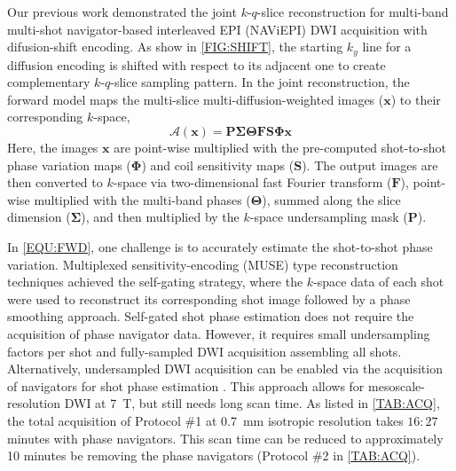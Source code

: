 \documentclass[AMA,STIX2COL,Linenumberson]{MRM}
\begin{document}
Our previous work \cite{tan_2024_naviepi} demonstrated
the joint $k$-$q$-slice reconstruction 
for multi-band multi-shot navigator-based interleaved EPI (NAViEPI) DWI acquisition 
with difusion-shift encoding.
As show in \cref{FIG:SHIFT}, the starting $k_y$ line for a diffusion encoding is shifted 
with respect to its adjacent one to create complementary $k$-$q$-slice sampling pattern.
In the joint reconstruction, the forward model 
maps the multi-slice multi-diffusion-weighted images ($\mathbf{x}$)
to their corresponding $k$-space,
\begin{equation}
    \mathcal{A}(\mathbf{x}) = \mathbf{P \Sigma \Theta F S \Phi} \mathbf{x}
    \label{EQU:FWD}
\end{equation}
Here, the images $\mathbf{x}$ are point-wise multiplied
with the pre-computed shot-to-shot phase variation maps ($\mathbf{\Phi}$)
and coil sensitivity maps ($\mathbf{S}$).
The output images are then converted to $k$-space
via two-dimensional fast Fourier transform ($\mathbf{F}$),
point-wise multiplied with the multi-band phases ($\mathbf{\Theta}$),
summed along the slice dimension ($\mathbf{\Sigma}$),
and then multiplied by the $k$-space undersampling mask ($\mathbf{P}$).

In \cref{EQU:FWD}, one challenge is
to accurately estimate the shot-to-shot phase variation.
Multiplexed sensitivity-encoding (MUSE) type reconstruction techniques
\cite{liu_2004_diff_spiral,uecker_2009_nlinv_diff,chen_2013_muse,merrem_2019_nl_steam}
achieved the self-gating strategy,
where the $k$-space data of each shot were used to reconstruct
its corresponding shot image followed by a phase smoothing approach.
Self-gated shot phase estimation does not require
the acquisition of phase navigator data.
However, it requires small undersampling factors per shot and
fully-sampled DWI acquisition assembling all shots.
Alternatively, undersampled DWI acquisition can be enabled
via the acquisition of navigators for shot phase estimation
\cite{tan_2024_naviepi}.
This approach allows for mesoscale-resolution DWI at \SI{7}{\tesla},
but still needs long scan time.
As listed in \cref{TAB:ACQ}, the total acquisition of
Protocol \#1 at \SI{0.7}{mm} isotropic resolution
takes $16:27$ minutes with phase navigators.
This scan time can be reduced to approximately 10 minutes
be removing the phase navigators (Protocol \#2 in \cref{TAB:ACQ}).
\end{document}
